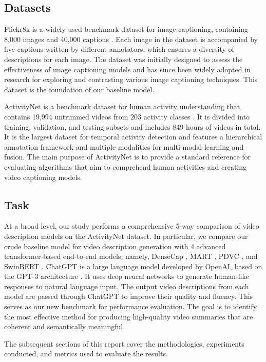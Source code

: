\subsection{Datasets}
Flickr8k is a widely used benchmark dataset for image captioning, containing 8,000 images and 40,000 captions \cite{hodosh2013framing}. Each image in the dataset is accompanied by five captions written by different annotators, which ensures a diversity of descriptions for each image. The dataset was initially designed to assess the effectiveness of image captioning models and has since been widely adopted in research for exploring and contrasting various image captioning techniques. This dataset is the foundation of our baseline model.

ActivityNet is a benchmark dataset for human activity understanding that contains 19,994 untrimmed videos from 203 activity classes \cite{activitynet}. It is divided into training, validation, and testing subsets and includes 849 hours of videos in total. It is the largest dataset for temporal activity detection and features a hierarchical annotation framework and multiple modalities for multi-modal learning and fusion. The main purpose of ActivityNet is to provide a standard reference for evaluating algorithms that aim to comprehend human activities and creating video captioning models.

\subsection{Task}
At a broad level, our study performs a comprehensive 5-way comparison of video description models on the ActivityNet dataset. In particular, we compare our crude baseline model for video description generation with 4 advanced transformer-based end-to-end models, namely, DenseCap \cite{johnson2016densecap}, MART \cite{liu2020mobile}, PDVC \cite{le2021pdvc}, and SwinBERT \cite{lin2022swinbert}. ChatGPT is a large language model developed by OpenAI, based on the GPT-3 architecture \cite{Brown2020LanguageMA}. It uses deep neural networks to generate human-like responses to natural language input. The output video descriptions from each model are passed through ChatGPT to improve their quality and fluency. This serves as our new benchmark for performance evaluation. The goal is to identify the most effective method for producing high-quality video summaries that are coherent and semantically meaningful. 

The subsequent sections of this report cover the methodologies, experiments conducted, and metrics used to evaluate the results.